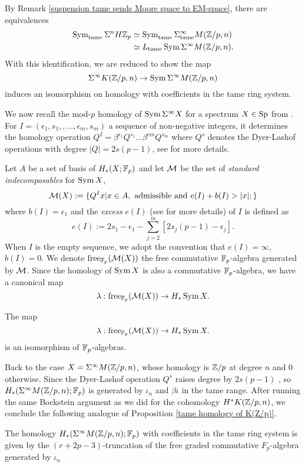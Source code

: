 By Remark \ref{suspension tame sends Moore space to EM-space}, there are equivalences
    \begin{align*}
			\operatorname{Sym}_{\operatorname{\operatorname{tame}}} \Sigma^n H{\mathbb{Z}}_p & \simeq \operatorname{Sym}_{\operatorname{\operatorname{tame}}} \Sigma^{\infty}_{\operatorname{\operatorname{tame}}}M({\mathbb{Z}}/p,n)\\
			&  \simeq L_{\operatorname{\operatorname{tame}}}\operatorname{Sym} \Sigma^{\infty}  M({\mathbb{Z}}/p,n).
	\end{align*}
With this identification, we are reduced to show the map
$$
\Sigma^{\infty}K({\mathbb{Z}}/p,n) \to 
	\operatorname{Sym} \Sigma^{\infty}  M({\mathbb{Z}}/p,n)
$$
induces an isomorphism on homology with coefficients in the tame ring system.

We now recall the mod-$p$ homology of $\operatorname{Sym} \Sigma^{\infty} X$ for a spectrum $X\in \operatorname{Sp}$ from \cite[IX.2.1]{H_inf}. 
For $I = (\epsilon_1, s_1, , \dots, \epsilon_m, s_m)$ a sequence of non-negative integers, it determines the homology operation 
$Q^I =\beta^{\epsilon_1}Q^{s_1}\dots \beta^{\epsilon m}Q^{s_m}$ where $Q^s$ denotes the Dyer-Lashof operations with degree $|Q|=2s(p-1)$, see \cite{Cohen-Lada-May_homology} for more details.



Let $A$ be a set of basis of $H_*(X;{\mathbb{F}}_p)$ and let ${\mathcal{M}}$ be the set of \emph{standard indecomposables} for $\operatorname{Sym} X$,
\[
{\mathcal{M}}(X):=\{
Q^I x | x \in A,  \text{ admissible and } e(I)+b(I) > \lvert x\rvert;
\}
\]
where $b(I)=\epsilon_1$ and the \emph{excess} $e(I)$ (see \cite[I.2]{Cohen-Lada-May_homology} for more details) of $I$ is defined as 
\[
e(I):= 2s_1-\epsilon_1 - \sum_{j=2}^{m}[2s_j(p-1)-\epsilon_j].
\]
When $I$ is the empty sequence, we adopt the convention that $e(I)=\infty$, $b(I)=0$.
We denote $\operatorname{free}_{{\mathbb{F}}_p}({\mathcal{M}}(X))$ the free commutative ${\mathbb{F}}_p$-algebra generated by ${\mathcal{M}}$.
Since the homology of $\operatorname{Sym} X$ is also a commutative ${\mathbb{F}}_p$-algebra, we have a canonical map
\[
\lambda: \operatorname{free}_{{\mathbb{F}}_p}({\mathcal{M}}(X)) \to
H_{*} \operatorname{Sym} X.
\]
\begin{theorem}
	\cite[IX.2.1]{H_inf}
	The map 
	\[
\lambda: \operatorname{free}_{{\mathbb{F}}_p}({\mathcal{M}}(X)) \to
H_{*} \operatorname{Sym} X.
\]
is an isomorphism of ${\mathbb{F}}_p$-algebras.
\end{theorem}

Back to the case $X=\Sigma^{\infty} M({\mathbb{Z}}/p,n)$, whose homology is ${\mathbb{Z}}/p$ at degree $n$ and $0$ otherwise.
Since the Dyer-Lashof operation $Q^s$ raises degree by $2s(p-1)$ \cite[I, Theorem 1.1]{Cohen-Lada-May_homology}, so $H_* (\Sigma^{\infty} M({\mathbb{Z}}/p,n); {\mathbb{F}}_p)$ is generated by $\iota_n$ and $\beta \iota$ in the tame range. After running the same Bockstein argument as we did for the cohomology $H^* K({\mathbb{Z}}/p,n)$, we conclude the following analogue of Proposition \ref{tame homology of K(Z/p)}.
\begin{corollary}
The homology $H_* (\Sigma^{\infty} M({\mathbb{Z}}/p,n); {\mathbb{F}}_p)$ with coefficients in the tame ring system is given by the $(r+2p-3)$-truncation of the free graded commutative $F_{p}$-algebra generated by $\iota_n$
\end{corollary}

